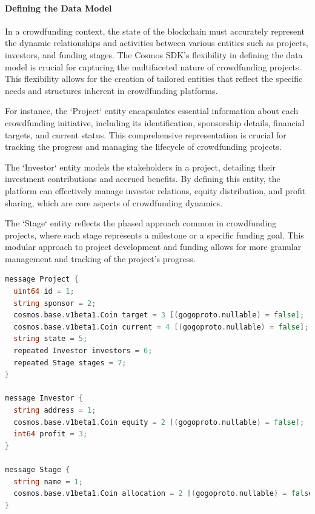 \paragraph{Defining the Data Model}
\label{par:defining-the-data-model}

In a crowdfunding context, the state of the blockchain must accurately represent the dynamic relationships and activities between various entities such as projects, investors, and funding stages. The Cosmos SDK's flexibility in defining the data model is crucial for capturing the multifaceted nature of crowdfunding projects. This flexibility allows for the creation of tailored entities that reflect the specific needs and structures inherent in crowdfunding platforms.

For instance, the `Project` entity encapsulates essential information about each crowdfunding initiative, including its identification, sponsorship details, financial targets, and current status. This comprehensive representation is crucial for tracking the progress and managing the lifecycle of crowdfunding projects.

The `Investor` entity models the stakeholders in a project, detailing their investment contributions and accrued benefits. By defining this entity, the platform can effectively manage investor relations, equity distribution, and profit sharing, which are core aspects of crowdfunding dynamics.

The `Stage` entity reflects the phased approach common in crowdfunding projects, where each stage represents a milestone or a specific funding goal. This modular approach to project development and funding allows for more granular management and tracking of the project's progress.

\begin{lstlisting}[language=go, caption={Protobuf Definitions for Project, Investor, and Stage}, label=lst:protobuf-definitions]
message Project {
  uint64 id = 1;
  string sponsor = 2;
  cosmos.base.v1beta1.Coin target = 3 [(gogoproto.nullable) = false];
  cosmos.base.v1beta1.Coin current = 4 [(gogoproto.nullable) = false];
  string state = 5;
  repeated Investor investors = 6;
  repeated Stage stages = 7;
}

message Investor {
  string address = 1;
  cosmos.base.v1beta1.Coin equity = 2 [(gogoproto.nullable) = false];
  int64 profit = 3;
}

message Stage {
  string name = 1;
  cosmos.base.v1beta1.Coin allocation = 2 [(gogoproto.nullable) = false];
}
\end{lstlisting}


